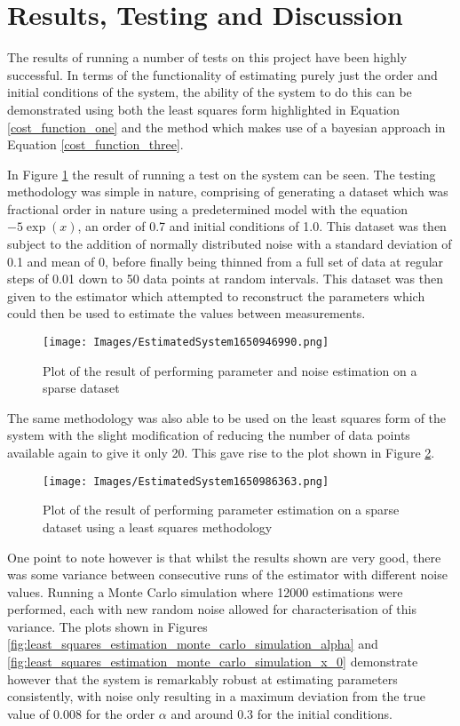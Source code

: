 \section{Results, Testing and Discussion}

The results of running a number of tests on this project have been highly successful. In terms of the functionality of estimating purely just the order and initial conditions of the system, the ability of the system to do this can be demonstrated using both the least squares form highlighted in Equation \ref{cost_function_one} and the method which makes use of a bayesian approach in Equation \ref{cost_function_three}. 

In Figure \ref{fig:noise_estimation_simulation} the result of running a test on the system can be seen. The testing methodology was simple in nature, comprising of generating a dataset which was fractional order in nature using a predetermined model with the equation $-5\exp(x)$, an order of 0.7 and initial conditions of 1.0. This dataset was then subject to the addition of normally distributed noise with a standard deviation of 0.1 and mean of 0, before finally being thinned from a full set of data at regular steps of 0.01 down to 50 data points at random intervals. This dataset was then given to the estimator which attempted to reconstruct the parameters which could then be used to estimate the values between measurements.

\begin{figure}[h]
	\centering
	\texttt{[image: Images/EstimatedSystem1650946990.png]}
	\caption{Plot of the result of performing parameter and noise estimation on a sparse dataset}
    \label{fig:noise_estimation_simulation}
\end{figure}

The same methodology was also able to be used on the least squares form of the system with the slight modification of reducing the number of data points available again to give it only 20. This gave rise to the plot shown in Figure \ref{fig:least_squares_estimation_simulation}. 

\begin{figure}[h]
	\centering
	\texttt{[image: Images/EstimatedSystem1650986363.png]}
	\caption{Plot of the result of performing parameter estimation on a sparse dataset using a least squares methodology}
    \label{fig:least_squares_estimation_simulation}
\end{figure}

One point to note however is that whilst the results shown are very good, there was some variance between consecutive runs of the estimator with different noise values. Running a Monte Carlo simulation where 12000 estimations were performed, each with new random noise allowed for characterisation of this variance. The plots shown in Figures \ref{fig:least_squares_estimation_monte_carlo_simulation_alpha} and \ref{fig:least_squares_estimation_monte_carlo_simulation_x_0} demonstrate however that the system is remarkably robust at estimating parameters consistently, with noise only resulting in a maximum deviation from the true value of 0.008 for the order $\alpha$ and around 0.3 for the initial conditions.

